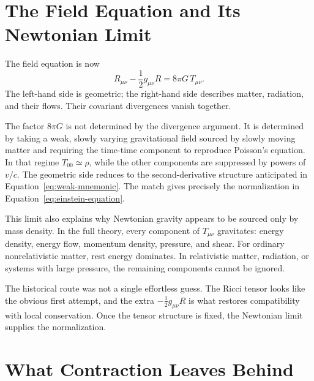 \section{The Field Equation and Its Newtonian Limit}

The field equation is now
\begin{equation}
 \boxed{
 R_{\mu\nu}-\frac12 g_{\mu\nu}R
 =
 8\pi G\,T_{\mu\nu}
 }.
 \label{eq:einstein-equation}
\end{equation}
The left-hand side is geometric; the right-hand side describes matter,
radiation, and their flows. Their covariant divergences vanish together.

The factor \(8\pi G\) is not determined by the divergence argument. It is
determined by taking a weak, slowly varying gravitational field sourced by
slowly moving matter and requiring the time-time component to reproduce
Poisson's equation. In that regime \(T_{00}\simeq\rho\), while the other
components are suppressed by powers of \(v/c\). The geometric side reduces
to the second-derivative structure anticipated in
Equation~\eqref{eq:weak-mnemonic}. The match gives precisely the normalization
in Equation~\eqref{eq:einstein-equation}.

This limit also explains why Newtonian gravity appears to be sourced only by
mass density. In the full theory, every component of \(T_{\mu\nu}\) gravitates:
energy density, energy flow, momentum density, pressure, and shear. For
ordinary nonrelativistic matter, rest energy dominates. In relativistic
matter, radiation, or systems with large pressure, the remaining components
cannot be ignored.

The historical route was not a single effortless guess. The Ricci tensor
looks like the obvious first attempt, and the extra
\(-\tfrac12g_{\mu\nu}R\) is what restores compatibility with local
conservation. Once the tensor structure is fixed, the Newtonian limit
supplies the normalization.

\section{What Contraction Leaves Behind}

\begin{classroomqa}
\end{classroomqa}

